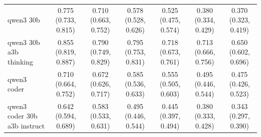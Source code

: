 \begin{table}[h!]
{\begin{tabular}{lcccccc}
qwen3 30b & \cellcolor{green!50}0.775 (0.733, 0.815) & \cellcolor{green!55}0.710 (0.663, 0.752) & \cellcolor{green!25}0.578 (0.528, 0.626) & \cellcolor{green!30}0.525 (0.475, 0.574) & \cellcolor{green!20}0.380 (0.334, 0.429) & \cellcolor{green!25}0.370 (0.323, 0.419) \\
qwen3 30b a3b thinking & \cellcolor{green!75}0.855 (0.819, 0.887) & \cellcolor{green!65}0.790 (0.749, 0.829) & \cellcolor{green!75}0.795 (0.753, 0.831) & \cellcolor{green!70}0.718 (0.673, 0.761) & \cellcolor{green!75}0.713 (0.666, 0.756) & \cellcolor{green!75}0.650 (0.602, 0.696) \\
qwen3 coder & \cellcolor{green!35}0.710 (0.664, 0.752) & \cellcolor{green!30}0.672 (0.626, 0.717) & \cellcolor{green!35}0.585 (0.536, 0.633) & \cellcolor{green!35}0.555 (0.505, 0.603) & \cellcolor{green!40}0.495 (0.446, 0.544) & \cellcolor{green!50}0.475 (0.426, 0.523) \\
qwen3 coder 30b a3b instruct & \cellcolor{green!14}0.642 (0.594, 0.689) & \cellcolor{green!14}0.583 (0.533, 0.631) & \cellcolor{green!14}0.495 (0.446, 0.544) & \cellcolor{green!14}0.445 (0.397, 0.494) & \cellcolor{green!25}0.380 (0.333, 0.428) & \cellcolor{green!14}0.343 (0.297, 0.390) \\
\bottomrule
\end{tabular}
}
\end{table}